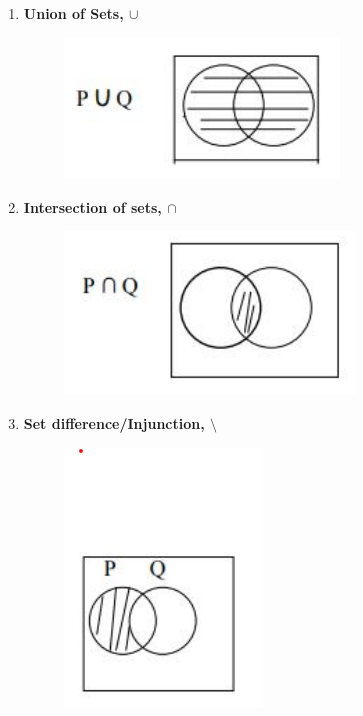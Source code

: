 \documentclass[12pt]{report}
\begin{document}
        \\
        \begin{enumerate}
            \item \textbf{Union of Sets, $\cup$} \\
                \begin{figure}[h!]
                    \includegraphics[width=0.4\linewidth]{union.png}
                \end{figure}
            \item \textbf{Intersection of sets, $\cap$} \\
                \begin{figure}[h!]
                    \includegraphics[width=0.4\linewidth]{intersection.png}
                \end{figure}
            \item \textbf{Set difference/Injunction, $\setminus$} \\
                \begin{figure}[h!]
                    \includegraphics[width=0.4\linewidth]{set_difference.png}

\end{figure}
\end{enumerate}
\end{document}
